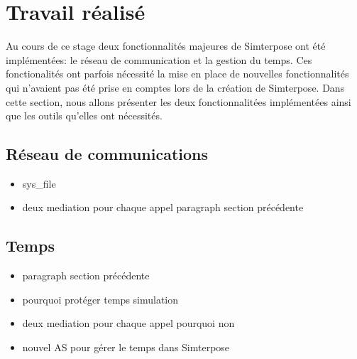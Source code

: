 \section{Travail réalisé}
Au cours de ce stage deux fonctionnalités majeures de Simterpose ont été implémentées: le réseau de communication et la gestion du temps. Ces fonctionalités ont parfois nécessité la mise en place de nouvelles fonctionnalités qui n'avaient pas été prise en comptes lors de la création de Simterpose. Dans cette section, nous allons présenter les deux fonctionnalitées implémentées ainsi que les outils qu'elles ont nécessités.

\subsection{Réseau de communications}

\begin{itemize}
\item sys\_file
\item deux mediation pour chaque appel paragraph section précédente
\end{itemize}

\subsection{Temps}
\begin{itemize}
\item paragraph section précédente
\item pourquoi protéger temps simulation
\item deux mediation pour chaque appel pourquoi non
\item nouvel AS pour gérer le temps dans Simterpose
\end{itemize}
